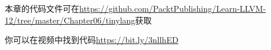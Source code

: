 本章的代码文件可在\url{https://github.com/PacktPublishing/Learn-LLVM-12/tree/master/Chapter06/tinylang}获取\par

你可以在视频中找到代码\url{https://bit.ly/3nllhED}\par